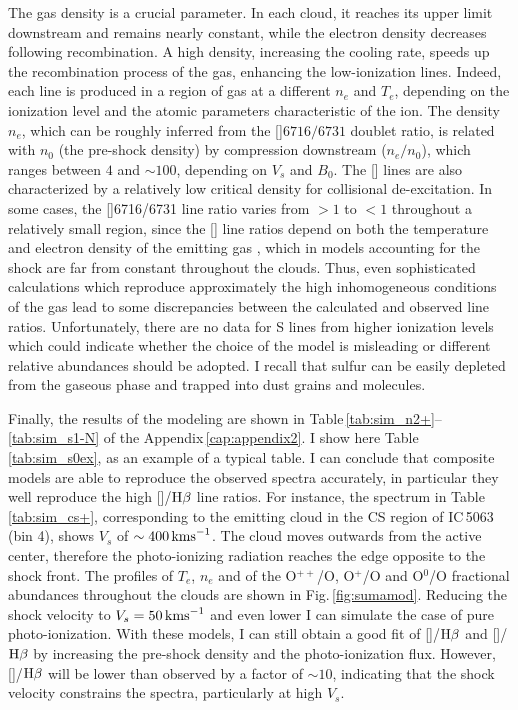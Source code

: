 \documentclass[../main.tex]{subfiles}
\begin{document}
The gas density is a crucial parameter. 
In each cloud, it reaches its upper limit downstream and remains nearly constant, while the electron density decreases following recombination. 
A high density, increasing the cooling rate, speeds up the recombination process of the gas, enhancing the low-ionization lines.
Indeed, each line is produced in a region of gas at a different $n_e$ and $T_e$, depending on the ionization level and the atomic parameters characteristic of the ion. 
The density $n_e$, which can be roughly inferred from the []$6716/6731$ doublet ratio, is related with $n_0$ (the pre-shock density) by compression downstream ($n_e/n_0$), which ranges between $4$ and $\sim100$, depending on $V_s$ and $B_0$. 
The [] lines are also characterized by a relatively low critical density for collisional de-excitation.  
In some cases, the []6716/6731 line ratio varies from $> 1$ to $< 1$ throughout a relatively small region, since the [] line ratios depend on both the temperature and electron density of the emitting gas \citep{OsterbrockAGN}, which in models accounting for the shock are far from constant throughout the clouds.
Thus, even sophisticated calculations which reproduce approximately the high inhomogeneous conditions of the gas lead to some discrepancies between the calculated and observed line ratios.
Unfortunately, there are no data for S lines from higher ionization levels which could indicate whether the choice of the model is misleading or different relative abundances should be adopted. 
I recall that sulfur can be easily depleted from the gaseous phase and trapped into dust grains and molecules.

Finally, the results of the modeling are shown in Table\,\ref{tab:sim_n2+}--\ref{tab:sim_s1-N} of the Appendix\,\ref{cap:appendix2}.
I show here Table\,\ref{tab:sim_s0ex}, as an example of a typical table. 
I can conclude that composite models are able to reproduce the observed spectra accurately, in particular they well reproduce the high []/$\Hb$ line ratios.
For instance, the spectrum in Table\,\ref{tab:sim_cs+}, corresponding to the emitting cloud in the CS region of IC\,5063 (bin 4), shows $V_s$ of $\sim 400\,\si{\kms}$. 
The cloud moves outwards from the active center, therefore the photo-ionizing radiation reaches the edge opposite to the shock front.
The profiles of $T_e$, $n_e$ and of the O$^{++}$/O, O$^+$/O and O$^0$/O fractional abundances throughout the clouds are shown in Fig.\,\ref{fig:sumamod}.
Reducing the shock velocity to $V_s =50\,\si{\kms}$ and even lower I can simulate the case of pure photo-ionization.
With these models, I can still obtain a good fit of []/$\Hb$ and []/$\Hb$ by increasing the pre-shock density and the photo-ionization flux.
However,  []/$\Hb$  will be lower than observed by a factor of $\sim 10$, indicating that the shock velocity constrains the spectra, particularly at high $V_s$.
\end{document}

